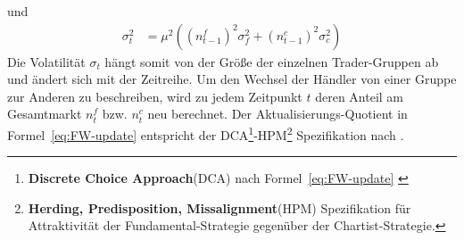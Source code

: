 \documentclass[ngerman]{ttlab-qualify}
\begin{document}
und
\begin{align}
\label{eq:FW-vol}
\sigma_t^2 &= \mu^2((n_{t-1}^f)^2\sigma_f^2 + (n_{t-1}^c)^2\sigma_c^2)
\end{align}
Die Volatilität $\sigma_t$ hängt somit von der Größe der einzelnen Trader-Gruppen ab und ändert sich mit der Zeitreihe. Um den Wechsel der Händler von einer Gruppe zur Anderen zu beschreiben, wird zu jedem Zeitpunkt $t$ deren Anteil am Gesamtmarkt  $n_t^f$ bzw. $n_t^c$ neu berechnet.
Der Aktualisierungs-Quotient in Formel~\ref{eq:FW-update} entspricht der DCA\footnote{\textbf{Discrete Choice Approach}(DCA) nach Formel~\ref{eq:FW-update} \parencite{bertschinger:2018}}-HPM\footnote{\textbf{Herding, Predisposition, Missalignment}(HPM) Spezifikation für Attraktivität der Fundamental-Strategie gegenüber der Chartist-Strategie\parencite{bertschinger:2018}.} Spezifikation nach \parencite{bertschinger:2018, FW:2011}.\\
\end{document}
